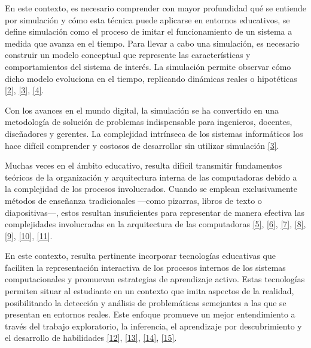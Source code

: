 \documentclass[12pt,oneside]{templates/unerthesis}
\begin{document}
En este contexto, es necesario comprender con mayor profundidad qué se entiende por simulación y cómo esta técnica puede aplicarse en entornos educativos, se define simulación como el proceso de imitar el funcionamiento de un sistema a medida que avanza en el tiempo. Para llevar a cabo una simulación, es necesario construir un modelo conceptual que represente las características y comportamientos del sistema de interés. La simulación permite observar cómo dicho modelo evoluciona en el tiempo, replicando dinámicas reales o hipotéticas \protect\hyperlink{ref-banks_discrete-event_2010}{{[}2{]}}, \protect\hyperlink{ref-law_simulation_2015}{{[}3{]}}, \protect\hyperlink{ref-robinson_simulation_2014}{{[}4{]}}.

Con los avances en el mundo digital, la simulación se ha convertido en una metodología de solución de problemas indispensable para ingenieros, docentes, diseñadores y gerentes. La complejidad intrínseca de los sistemas informáticos los hace difícil comprender y costosos de desarrollar sin utilizar simulación \protect\hyperlink{ref-law_simulation_2015}{{[}3{]}}.

Muchas veces en el ámbito educativo, resulta difícil transmitir fundamentos teóricos de la organización y arquitectura interna de las computadoras debido a la complejidad de los procesos involucrados. Cuando se emplean exclusivamente métodos de enseñanza tradicionales ---como pizarras, libros de texto o diapositivas---, estos resultan insuficientes para representar de manera efectiva las complejidades involucradas en la arquitectura de las computadoras \protect\hyperlink{ref-lion_simuladores_2005}{{[}5{]}}, \protect\hyperlink{ref-contreras_uso_2010}{{[}6{]}}, \protect\hyperlink{ref-garcia-garcia_pbbcache_2020}{{[}7{]}}, \protect\hyperlink{ref-grossi2005simulador}{{[}8{]}}, \protect\hyperlink{ref-herruzo2002desarrollo}{{[}9{]}}, \protect\hyperlink{ref-Martinez1994}{{[}10{]}}, \protect\hyperlink{ref-concheiro2005simula3ms}{{[}11{]}}.

En este contexto, resulta pertinente incorporar tecnologías educativas que faciliten la representación interactiva de los procesos internos de los sistemas computacionales y promuevan estrategias de aprendizaje activo. Estas tecnologías permiten situar al estudiante en un contexto que imita aspectos de la realidad, posibilitando la detección y análisis de problemáticas semejantes a las que se presentan en entornos reales. Este enfoque promueve un mejor entendimiento a través del trabajo exploratorio, la inferencia, el aprendizaje por descubrimiento y el desarrollo de habilidades \protect\hyperlink{ref-nova_tool_2013}{{[}12{]}}, \protect\hyperlink{ref-mustafa_evaluating_2010}{{[}13{]}}, \protect\hyperlink{ref-garcia-carballeira_wepsim_2020}{{[}14{]}}, \protect\hyperlink{ref-prasad2016using}{{[}15{]}}.
\end{document}
